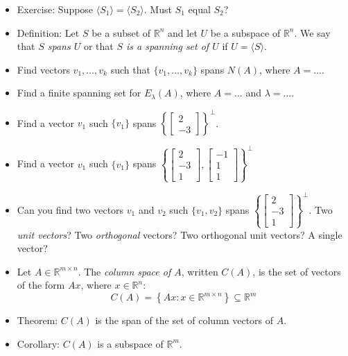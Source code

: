 \documentclass{amsart}
\newcommand{\RR}{\mathbb{R}}
\begin{document}
\begin{itemize}
\item Exercise: Suppose $\langle S_1\rangle = \langle S_2\rangle$. Must $S_1$ equal $S_2$?

\item Definition: Let $S$ be a subset of $\RR^n$ and let $U$ be a subspace of $\RR^n$.
We say that \emph{$S$ spans $U$} or that \emph{$S$ is a spanning set of $U$} if $U=\langle S\rangle$.

\item Find vectors $v_1,\ldots,v_k$ such that $\{v_1,\ldots,v_k\}$ spans $N(A)$, where $A=...$.

\item Find a finite spanning set for $E_\lambda(A)$, where $A=...$ and $\lambda=...$.

\item Find a vector $v_1$ such $\{v_1\}$ spans $\left\{\begin{bmatrix}2\\-3\end{bmatrix}\right\}^\perp$.

\item Find a vector $v_1$ such $\{v_1\}$ spans
$\left\{\begin{bmatrix}2\\-3\\1\end{bmatrix},
  \begin{bmatrix}-1\\1\\1\end{bmatrix}\right\}^\perp$

\item Can you find two vectors $v_1$ and $v_2$ such $\{v_1, v_2\}$ spans
$\left\{\begin{bmatrix}2\\-3\\1\end{bmatrix}
  \right\}^\perp$. Two \emph{unit vectors}? Two \emph{orthogonal} vectors? Two orthogonal unit vectors? A single vector?


\item Let $A\in\RR^{m\times n}$. The \emph{column space of $A$}, written $C(A)$, is the set of vectors of the form $Ax$, where $x\in\RR^n$:
$$
C(A) = \left\{Ax : x\in\RR^{m\times n}\right\} \subseteq \RR^m
$$

\item Theorem: $C(A)$ is the span of the set of column vectors of $A$.

\item Corollary: $C(A)$ is a subspace of $\RR^m$.


\end{itemize}
\end{document}
